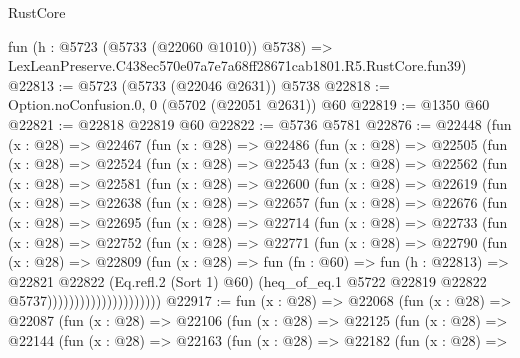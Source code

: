 \begin{lexlean}{RustCore}
\begin{coremodule}
    fun (h : @5723 (@5733 (@22060 @1010)) @5738) =>
    LexLeanPreserve.C438ec570e07a7e7a68ff28671cab1801.R5.RustCore.fun39)
@22813 := @5723 (@5733 (@22046 @2631)) @5738
@22818 := Option.noConfusion.{0, 0} (@5702 (@22051 @2631)) @60
@22819 := @1350 @60
@22821 := @22818 @22819 @60
@22822 := @5736 @5781
@22876 := @22448
    (fun (x : @28) =>
    @22467
      (fun (x : @28) =>
      @22486
        (fun (x : @28) =>
        @22505
          (fun (x : @28) =>
          @22524
            (fun (x : @28) =>
            @22543
              (fun (x : @28) =>
              @22562
                (fun (x : @28) =>
                @22581
                  (fun (x : @28) =>
                  @22600
                    (fun (x : @28) =>
                    @22619
                      (fun (x : @28) =>
                      @22638
                        (fun (x : @28) =>
                        @22657
                          (fun (x : @28) =>
                          @22676
                            (fun (x : @28) =>
                            @22695
                              (fun (x : @28) =>
                              @22714
                                (fun (x : @28) =>
                                @22733
                                  (fun (x : @28) =>
                                  @22752
                                    (fun (x : @28) =>
                                    @22771
                                      (fun (x : @28) =>
                                      @22790
                                        (fun (x : @28) =>
                                        @22809
                                          (fun (x : @28) =>
                                          fun (fn : @60) =>
                                          fun (h : @22813) =>
                                          @22821
                                            @22822
                                            (Eq.refl.{2} (Sort 1) @60)
                                            (heq_of_eq.{1}
                                              @5722
                                              @22819
                                              @22822
                                              @5737)))))))))))))))))))))
@22917 := fun (x : @28) =>
  @22068
    (fun (x : @28) =>
    @22087
      (fun (x : @28) =>
      @22106
        (fun (x : @28) =>
        @22125
          (fun (x : @28) =>
          @22144
            (fun (x : @28) =>
            @22163
              (fun (x : @28) =>
              @22182
                (fun (x : @28) =>

\end{coremodule}
\end{lexlean}
